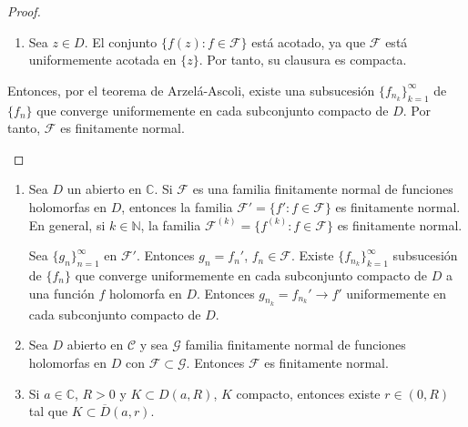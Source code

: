 \begin{proof}
\begin{itemize}
\begin{enumerate}
                  \item Sea $z \in D$.
                        El conjunto $\{f(z) : f \in \mathcal{F}\}$ está acotado, ya que $\mathcal{F}$ está uniformemente acotada en $\{z\}$.
                        Por tanto, su clausura es compacta.
              \end{enumerate}

              Entonces, por el teorema de Arzelá-Ascoli, existe una subsucesión $\{f_{n_k}\}_{k=1}^\infty$ de $\{f_n\}$ que converge uniformemente en cada subconjunto compacto de $D$.
              Por tanto, $\mathcal{F}$ es finitamente normal.
    \end{itemize}
\end{proof}

\begin{remark}
    \hfill
    \begin{enumerate}
        \item Sea $D$ un abierto en $\mathbb{C}$.
              Si $\mathcal{F}$ es una familia finitamente normal de funciones holomorfas en $D$, entonces la familia $\mathcal{F}' = \{f' : f \in \mathcal{F}\}$ es finitamente normal.
              En general, si $k \in \mathbb{N}$, la familia $\mathcal{F}^{(k)} = \{f^{(k)} : f \in \mathcal{F}\}$ es finitamente normal.

              Sea $\{g_n\}_{n=1}^\infty$ en $\mathcal{F}'$.
              Entonces $g_n = f_n'$, $f_n \in \mathcal{F}$.
              Existe $\{f_{n_k}\}_{k=1}^\infty$ subsucesión de $\{f_n\}$ que converge uniformemente en cada subconjunto compacto de $D$ a una función $f$ holomorfa en $D$.
              Entonces $g_{n_k} = f_{n_k}' \to f'$ uniformemente en cada subconjunto compacto de $D$.

        \item Sea $D$ abierto en $\mathcal{C}$ y sea $\mathcal{G}$ familia finitamente normal de funciones holomorfas en $D$ con $\mathcal{F} \subset \mathcal{G}$.
              Entonces $\mathcal{F}$ es finitamente normal.

        \item Si $a \in \mathbb{C}$, $R > 0$ y $K \subset D(a, R)$, $K$ compacto, entonces existe $r \in (0, R)$ tal que $K \subset \overline{D}(a, r)$.
    \end{enumerate}
\end{remark}

